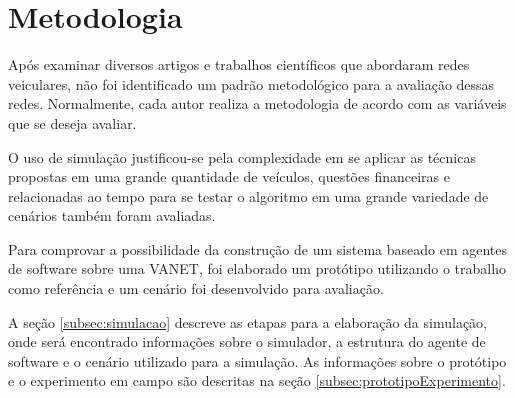 \section{Metodologia}
\label{sec:metodologia}

Após examinar diversos artigos e trabalhos científicos que abordaram redes veiculares, não foi identificado um padrão metodológico para a avaliação dessas redes. Normalmente, cada autor realiza a metodologia de acordo com as variáveis que se deseja avaliar. 

O uso de simulação justificou-se pela complexidade em se aplicar as técnicas propostas em uma grande quantidade de veículos, questões financeiras e relacionadas ao tempo para se testar o algoritmo em uma grande variedade de cenários também foram avaliadas.

Para comprovar a possibilidade da construção de um sistema baseado em agentes de software sobre uma VANET, foi elaborado um protótipo utilizando o trabalho \cite{santanaMestrado:2014} como referência e um cenário foi desenvolvido para avaliação.

A seção \ref{subsec:simulacao} descreve as etapas para a elaboração da simulação, onde será encontrado informações sobre o simulador, a estrutura do agente de software e o cenário utilizado para a simulação. As informações sobre o protótipo e o experimento em campo são descritas na seção \ref{subsec:prototipoExperimento}.





